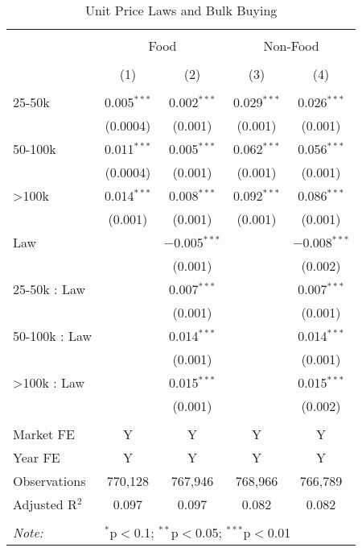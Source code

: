 
\begin{table}[!htbp] \centering 
  \caption{Unit Price Laws and Bulk Buying} 
  \label{tab:unitPriceLaw} 
\begin{tabular}{@{\extracolsep{5pt}}lcccc} 
\\[-1.8ex]\hline 
\hline \\[-1.8ex] 
 & \multicolumn{2}{c}{Food} & \multicolumn{2}{c}{Non-Food} \\ 
\\[-1.8ex] & (1) & (2) & (3) & (4)\\ 
\hline \\[-1.8ex] 
 25-50k & 0.005$^{***}$ & 0.002$^{***}$ & 0.029$^{***}$ & 0.026$^{***}$ \\ 
  & (0.0004) & (0.001) & (0.001) & (0.001) \\ 
  50-100k & 0.011$^{***}$ & 0.005$^{***}$ & 0.062$^{***}$ & 0.056$^{***}$ \\ 
  & (0.0004) & (0.001) & (0.001) & (0.001) \\ 
  >100k & 0.014$^{***}$ & 0.008$^{***}$ & 0.092$^{***}$ & 0.086$^{***}$ \\ 
  & (0.001) & (0.001) & (0.001) & (0.001) \\ 
  Law &  & $-$0.005$^{***}$ &  & $-$0.008$^{***}$ \\ 
  &  & (0.001) &  & (0.002) \\ 
  25-50k : Law &  & 0.007$^{***}$ &  & 0.007$^{***}$ \\ 
  &  & (0.001) &  & (0.001) \\ 
  50-100k : Law &  & 0.014$^{***}$ &  & 0.014$^{***}$ \\ 
  &  & (0.001) &  & (0.001) \\ 
  >100k : Law &  & 0.015$^{***}$ &  & 0.015$^{***}$ \\ 
  &  & (0.001) &  & (0.002) \\ 
 \hline \\[-1.8ex] 
Market FE & Y & Y & Y & Y \\ 
Year FE & Y & Y & Y & Y \\ 
Observations & 770,128 & 767,946 & 768,966 & 766,789 \\ 
Adjusted R$^{2}$ & 0.097 & 0.097 & 0.082 & 0.082 \\ 
\hline 
\hline \\[-1.8ex] 
\textit{Note:}  & \multicolumn{4}{l}{$^{*}$p$<$0.1; $^{**}$p$<$0.05; $^{***}$p$<$0.01} \\ 
\end{tabular} 
\end{table} 
